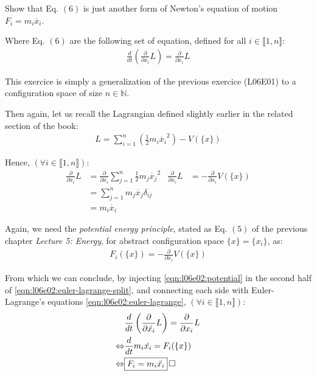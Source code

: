 \documentclass[solutions.tex]{subfiles}
\begin{document}
\maketitle
\begin{exercise}
Show that Eq. $(6)$ is just another form of Newton's
equation of motion $F_i = m_i \ddot{x_i}$.
\end{exercise}
Where Eq. $(6)$ are the following set of equation, defined for
all $i\in\llbracket 1, n\rrbracket$:
\begin{align}
	\frac{d}{dt}\left(\frac{\partial}{\partial\dot{x_i}}L\right)
		= \frac{\partial}{\partial x_i}L
	\label{eqn:l06e02:euler-lagrange}
\end{align}

\begin{remark} This exercice is simply a generalization
of the previous exercice (L06E01) to a configuration space
of size $n\in\mathbb{N}$.
\end{remark}

Then again, let us recall the Lagrangian defined slightly earlier
in the related section of the book:
\begin{align}
	L = \sum_{i=1}^n\left(\frac{1}{2}m_i\dot{x_i}^2\right)-V(\{x\})
	\label{eqn:l06e02:lagrangian}
\end{align}

Hence, $(\forall i \in\llbracket 1, n\rrbracket)$:
\begin{align}
	\frac{\partial}{\partial\dot{x_i}}L &=
		\frac{\partial}{\partial\dot{x_i}}
			\sum_{j=1}^n\frac{1}{2}m_j\dot{x_j}^2
	& \frac{\partial}{\partial x_i}L &= -\frac{\partial}{\partial x_i}V(\{x\})
		\nonumber \\
	~ &= \sum_{j=1}^n m_j \dot{x_j}\delta_{ij} & ~ & ~\nonumber \\
	~ &= m_i \dot{x_i} & ~ & ~
	\label{eqn:l06e02:euler-lagrange-split}
\end{align}

Again, we need the \textit{potential energy principle}, stated
as Eq. $(5)$ of the previous chapter \textit{Lecture 5: Energy},
for abstract configuration space $\{x\} = \{x_i\}$, as:
\begin{align}
	F_i(\{x\}) = -\frac{\partial}{\partial x_i}V(\{x\})
	\label{eqn:l06e02:potential}
\end{align}

From which we can conclude, by injecting \eqref{eqn:l06e02:potential}
in the second half of \eqref{eqn:l06e02:euler-lagrange-split}, and
connecting each side with Euler-Lagrange's equations
\eqref{eqn:l06e02:euler-lagrange}, $(\forall i \in\llbracket 1, n\rrbracket)$:
\begin{align*}
	~ & \frac{d}{dt}\left(\frac{\partial}{\partial\dot{x_i}}L\right)
		= \frac{\partial}{\partial x_i}L \\
	\Leftrightarrow & \frac{d}{dt}m_i \dot{x_i} = F_i(\{x\}) \\
	\Leftrightarrow & \boxed{F_i = m_i \ddot{x_i}} \qed
\end{align*}
\end{document}
